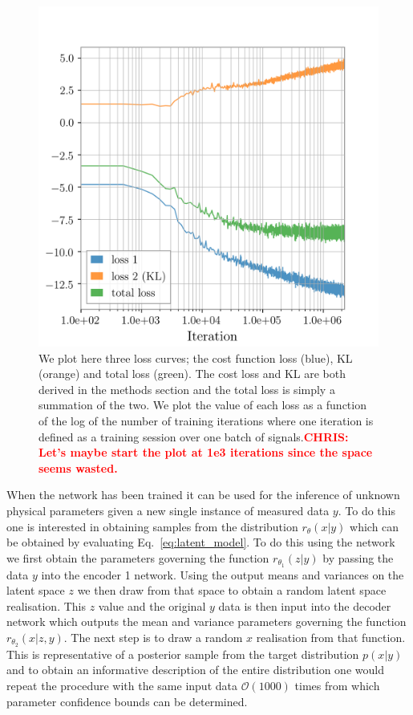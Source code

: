 \documentclass[%
showpacs,
 amsmath,amssymb,
 aps,
 twocolumn,
 prl,
 reprint,
floatfix,
]{revtex4-1}
\newcommand{\chris}[1]{\textbf{\textcolor{red}{CHRIS: #1}}}
\begin{document}
%
%
\begin{figure}
    \includegraphics[width=\columnwidth]{images/inv_losses_log.png}
\caption{\label{fig:loss_log} We plot here three loss curves; the cost
function loss (blue), KL (orange) and total loss (green). The cost  loss and KL
are both derived in the methods section and the total loss is simply a
summation of the two. We plot the value of each loss as a function of the log
of the number of training iterations where one iteration is defined as a
training session over one batch of signals.\chris{Let's maybe start the plot at
1e3 iterations since the space seems wasted.}}
\end{figure}

When the network has been trained it can be used for the inference of unknown
physical parameters given a new single instance of measured data $y$. To do
this one is interested in obtaining samples from the distribution
$r_{\theta}(x|y)$ which can be obtained by evaluating
Eq.~\ref{eq:latent_model}. To do this using the network we first obtain the
parameters governing the function $r_{\theta_{1}}(z|y)$ by passing the data $y$
into the encoder 1 network. Using the output means and variances on the latent space
$z$ we then draw from that space to obtain a random latent space realisation.
This $z$ value and the original $y$ data is then input into the decoder network
which outputs the mean and variance parameters governing the function
$r_{\theta_{2}}(x|z,y)$. The next step is to draw a random $x$ realisation from
that function. This is representative of a posterior sample from the target
distribution $p(x|y)$ and to obtain an informative description of the entire
distribution one would repeat the procedure with the same input data
$\mathcal{O}(1000)$ times from which parameter confidence bounds can be
determined.      
\end{document}
